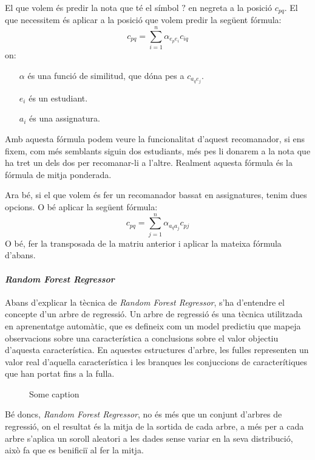 \documentclass[12pt,a4paper,catalan]{article}
\begin{document}
El que volem és predir la nota que té el símbol $?$ en negreta a la posició $c_{pq}$. El que necessitem és aplicar a la posició que volem predir la següent fórmula:
$$
	c_{pq} = \sum_{i=1}^n{\alpha_{e_pe_i}c_{iq}}
$$
on:
\begin{itemize}[leftmargin=.5in]
	\item [$\alpha$] és una funció de similitud, que dóna pes a $c_{a_qe_j}$.
	\item [$e_i$] és un estudiant.
	\item [$a_i$] és una assignatura.
\end{itemize}

Amb aquesta fórmula podem veure la funcionalitat d'aquest recomanador, si ens fixem, com més semblants siguin dos estudiants, més pes li donarem a la nota que ha tret un dels dos per recomanar-li a l'altre. Realment aquesta fórmula és la fórmula de mitja ponderada.

\newpage

Ara bé, si el que volem és fer un recomanador bassat en assignatures, tenim dues opcions. O bé aplicar la següent fórmula:
$$
	c_{pq} = \sum_{j=1}^n{\alpha_{a_qa_j}c_{pj}}
$$
O bé, fer la transposada de la matriu anterior i aplicar la mateixa fórmula d'abans.

\paragraph{\textit{Random Forest Regressor}}
Abans d'explicar la tècnica de \textit{Random Forest Regressor}, s'ha d'entendre el concepte d'un arbre de regressió. Un arbre de regressió és una tècnica utilitzada en aprenentatge automàtic, que es defineix com un model predictiu que mapeja observacions sobre una característica a conclusions sobre el valor objectiu d'aquesta característica. En aquestes estructures d'arbre, les fulles representen un valor real d'aquella característica i les branques les conjuccions de caracterítiques que han portat fins a la fulla.


\begin{figure}[h]
\centering
{}
\caption{Some caption}
\end{figure}

Bé doncs, \textit{Random Forest Regressor}, no és més que un conjunt d'arbres de regressió, on el resultat és la mitja de la sortida de cada arbre, a més per a cada arbre s'aplica un soroll aleatori a les dades sense variar en la seva distribució, això fa que es benificiï al fer la mitja. 
\end{document}
